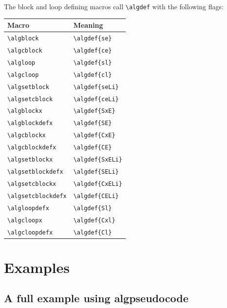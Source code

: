 \documentclass{article}
\begin{document}
\begin{minipage}[b]{0.5\linewidth}
\begin{minipage}[b]{0.5\linewidth}
\begin{minipage}[b]{0.5\linewidth}
\begin{minipage}[b]{0.5\linewidth}
\begin{minipage}[b]{0.5\linewidth}
\begin{minipage}[b]{0.5\linewidth}
\begin{minipage}[b]{0.5\linewidth}
The block and loop defining macros call \verb:\algdef: with the following flags:
\begin{center}
\begin{tabular}{|l|l|}
\hline
\textbf{Macro}&\textbf{Meaning}\\
\hline
\verb:\algblock:&\verb:\algdef{se}:\\
\hline
\verb:\algcblock:&\verb:\algdef{ce}:\\
\hline
\verb:\algloop:&\verb:\algdef{sl}:\\
\hline
\verb:\algcloop:&\verb:\algdef{cl}:\\
\hline
\verb:\algsetblock:&\verb:\algdef{seLi}:\\
\hline
\verb:\algsetcblock:&\verb:\algdef{ceLi}:\\
\hline
\verb:\algblockx:&\verb:\algdef{SxE}:\\
\hline
\verb:\algblockdefx:&\verb:\algdef{SE}:\\
\hline
\verb:\algcblockx:&\verb:\algdef{CxE}:\\
\hline
\verb:\algcblockdefx:&\verb:\algdef{CE}:\\
\hline
\verb:\algsetblockx:&\verb:\algdef{SxELi}:\\
\hline
\verb:\algsetblockdefx:&\verb:\algdef{SELi}:\\
\hline
\verb:\algsetcblockx:&\verb:\algdef{CxELi}:\\
\hline
\verb:\algsetcblockdefx:&\verb:\algdef{CELi}:\\
\hline
\verb:\algloopdefx:&\verb:\algdef{Sl}:\\
\hline
\verb:\algcloopx:&\verb:\algdef{Cxl}:\\
\hline
\verb:\algcloopdefx:&\verb:\algdef{Cl}:\\
\hline
\end{tabular}
\end{center}

\vfill
\section{Examples}
\subsection{A full example using \textbf{algpseudocode}}


\end{minipage}
\end{minipage}
\end{minipage}
\end{minipage}
\end{minipage}
\end{minipage}
\end{minipage}
\end{document}
